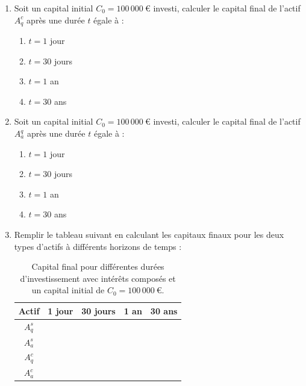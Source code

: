 \documentclass{article}
\begin{document}
            \begin{enumerate}[label=\textbf{Q2.\arabic*}]
                \item Soit un capital initial \( C_0 = 100\,000\ \text{€} \) investi, calculer le capital final de l'actif \( A_q^c \) après une durée \( t \) égale à :
                \begin{enumerate}[label=(\alph*)]
                    \item \( t = 1 \) jour
                    \item \( t = 30 \) jours
                    \item \( t = 1 \) an
                    \item \( t = 30 \) ans
                \end{enumerate}

                \item Soit un capital initial \( C_0 = 100\,000\ \text{€} \) investi, calculer le capital final de l'actif \( A_a^q \) après une durée \( t \) égale à :
                \begin{enumerate}[label=(\alph*)]
                    \item \( t = 1 \) jour
                    \item \( t = 30 \) jours
                    \item \( t = 1 \) an
                    \item \( t = 30 \) ans
                \end{enumerate}

                \item Remplir le tableau suivant en calculant les capitaux finaux pour les deux types d'actifs à différents horizons de temps :\\
                \begin{table}[h!]
                    \centering
                    \begin{tabular}{|c|c|c|c|c|}
                        \hline
                        \textbf{Actif} & \textbf{1 jour} & \textbf{30 jours} & \textbf{1 an} & \textbf{30 ans} \\
                        \hline
                        \( A_q^s \)    &                 &                   &               &                 \\
                        \hline
                        \( A_a^s \)    &                 &                   &               &                 \\
                        \hline
                        \( A_q^c \)    &                 &                   &               &                 \\
                        \hline
                        \( A_a^c \)    &                 &                   &               &                 \\
                        \hline
                    \end{tabular}
                    \caption{Capital final pour différentes durées d'investissement avec intérêts composés et un capital initial de \( C_0 = 100\,000\ \text{€} \).}
                    \label{tab:simple_interest_results}
                \end{table}


\end{enumerate}
\end{document}
